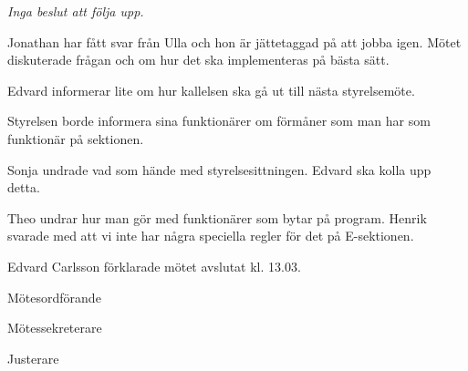 \documentclass[10pt]{article}
\def\mo{Edvard Carlsson}
\def\ms{Sonja Kenari}
\def\ji{Lina Samnegård}
\begin{document}
\begin{paragrafer}

\textit{Inga beslut att följa upp.}

Jonathan har fått svar från Ulla och hon är jättetaggad på att jobba igen. Mötet diskuterade 
    frågan och om hur det ska implementeras på bästa sätt.

Edvard informerar lite om hur kallelsen ska gå ut till nästa styrelsemöte.

Styrelsen borde informera sina funktionärer om förmåner som man har som funktionär på sektionen.

Sonja undrade vad som hände med styrelsesittningen. Edvard ska kolla upp detta.

Theo undrar hur man gör med funktionärer som bytar på program. Henrik svarade med att vi inte har några speciella regler för det på E-sektionen.

{\mo} förklarade mötet avslutat kl. 13.03.
\end{paragrafer}

\hidesignfoot
\begin{signatures}{3}
\signature{\mo}{Mötesordförande}
\signature{\ms}{Mötessekreterare}
\signature{\ji}{Justerare}
\end{signatures}
\end{document}
